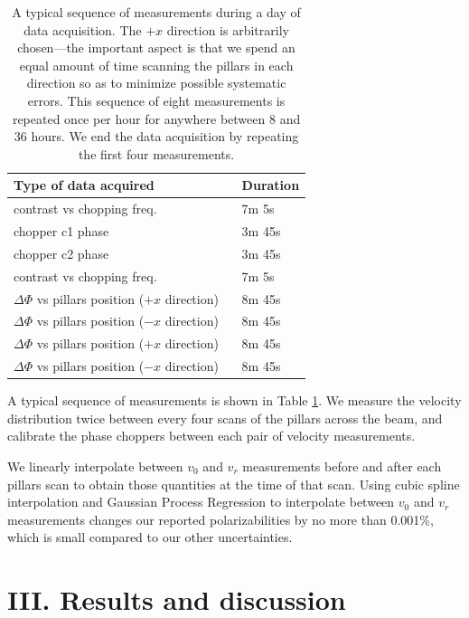 \documentclass[twocolumn,pra,showpacs,superscriptaddress,longbibliography]{revtex4-1}   %
\newcommand{\sspace}{$\enspace$}
\begin{document}
\begingroup
\begin{table}
\caption{\label{schedule}A typical sequence of measurements during a day of data acquisition. The $+x$ direction is arbitrarily chosen---the important aspect is that we spend an equal amount of time scanning the pillars in each direction so as to minimize possible systematic errors. This sequence of eight measurements is repeated once per hour for anywhere between 8 and 36 hours. We end the data acquisition by repeating the first four measurements.}
\begin{center}
\begin{tabular}{l l}
\hline
\hline
Type of data acquired & Duration \\
\hline
contrast vs chopping freq. & 7m 5s \\
chopper c1 phase & 3m 45s \\
chopper c2 phase & 3m 45s\\
contrast vs chopping freq. & 7m 5s \\
$\Delta\Phi$ vs pillars position ($+x$ direction) \sspace & 8m 45s \\
$\Delta\Phi$ vs pillars position ($-x$ direction) & 8m 45s \\
$\Delta\Phi$ vs pillars position ($+x$ direction) & 8m 45s \\
$\Delta\Phi$ vs pillars position ($-x$ direction) & 8m 45s \\
\hline
\hline
\end{tabular}
\end{center}
\end{table}
\endgroup

A typical sequence of measurements is shown in Table \ref{schedule}.
We measure the velocity distribution twice between every four scans of the pillars across the beam, and calibrate the phase choppers between each pair of velocity measurements.

We linearly interpolate between $v_0$ and $v_r$ measurements before and after each pillars scan to obtain those quantities at the time of that scan.
Using cubic spline interpolation and Gaussian Process Regression to interpolate between $v_0$ and $v_r$ measurements changes our reported polarizabilities by no more than 0.001\%, which is small compared to our other uncertainties.

\section{III. Results and discussion}
\end{document}

